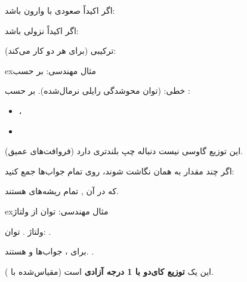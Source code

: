 
اگر  اکیداً صعودی با وارون  باشد:

اگر  اکیداً نزولی باشد:

ترکیبی (برای هر دو کار می‌کند):

\begin{PSbox}[unbreakable]{ex}{مثال مهندسی:  بر حسب }

 خطی:  (توان محوشدگی رایلی نرمال‌شده).\PSbr{} بر حسب : 

\begin{itemize}
\tightlist
\item
  ، 
\item
\end{itemize}


این توزیع گاوسی نیست  دنباله چپ بلندتری دارد (فروافت‌های عمیق).

\end{PSbox}



اگر چند مقدار  به همان  نگاشت شوند، روی تمام جواب‌ها جمع کنید:


که در آن ,  تمام ریشه‌های  هستند.

\begin{PSbox}[unbreakable]{ex}{مثال مهندسی: توان از ولتاژ }

ولتاژ . توان: .

برای ، جواب‌ها  و  هستند. .


این یک \textbf{توزیع کای‌دو با 1 درجه آزادی} است (مقیاس‌شده با ).

\end{PSbox}


